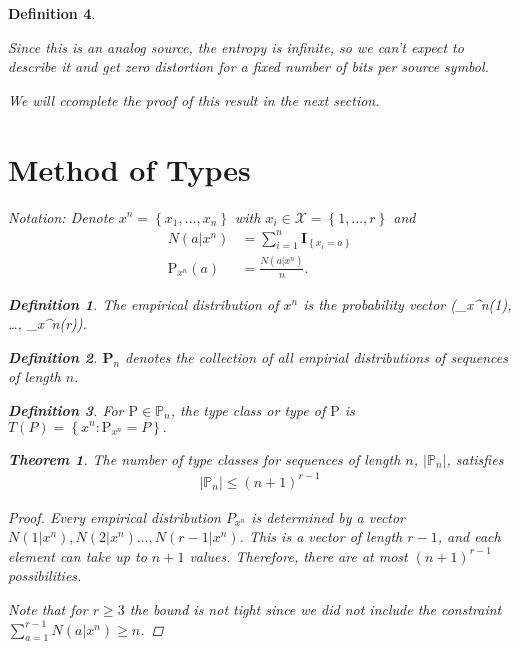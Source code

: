 \documentclass[12pt]{extarticle}
\newtheorem*{theorem}{Theorem}
\newtheorem*{definition}{Definition}
\def\XX{\mathcal{X}}
\def\P{\text{P}}
\def\PP{\mathbb{P}}
\begin{document}
\begin{definition}
\begin{enumerate}
    Since this is an analog source, the entropy is infinite, so we can't expect to describe it and get zero distortion for a fixed number of bits per source symbol. 

    We will ccomplete the proof of this result in the next section.
\end{enumerate}

\section{Method of Types}

Notation: Denote $x^n = \left\{ x_1, \dots, x_n \right\}$ with $x_i \in \XX = \left\{ 1, \dots, r \right\}$ and 
\begin{align*}
N(a | x^n) & = \sum_{i=1}^{n} \mathbf{I}_\left\{ x_i = a \right\} \\
\P_{x^n}(a) &= \frac{N(a | x^n)}{n}.
\end{align*}

\begin{definition}
  The empirical distribution of $x^n$ is the probability vector (\P_{x^n}(1), \dots, \P_{x^n}(r)).
\end{definition}

\begin{definition}
  $\mathbf{P}_n$ denotes the collection of all empirial distributions of sequences of length $n$.
\end{definition}

\begin{definition}
  For $\P \in \PP_n$, the type class or type of $\P$ is $T(P) = \left\{ x^n: \P_{x^n} = P \right\}.$
\end{definition}

\begin{theorem}
  The number of type classes for sequences of length $n$, $|\PP_n|$, satisfies
  \begin{align*}
    |\PP_n| \leq (n+1)^{r-1}
  \end{align*}
\end{theorem}

\begin{proof}
  Every empirical distribution $P_{x^n}$ is determined by a vector $N(1 | x^n), N(2 | x^n) \dots, N(r-1 | x^n)$.  This is a vector of length $r-1$, and each element can take up to $n+1$ values.  Therefore, there are at most $(n+1)^{r-1}$ possibilities.

  
  Note that for $r \geq 3$ the bound is not tight since we did not include the constraint $\sum_{a=1}^{r-1} N(a | x^n) \geq n$.
\end{proof}


\end{definition}
\end{document}
